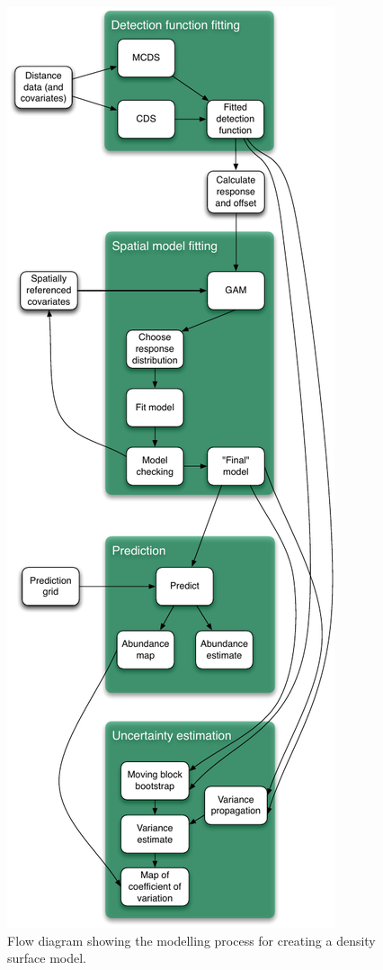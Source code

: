 \documentclass[a4paper,12pt]{article}
\begin{document}
\begin{figure}[h!]
  \caption{Flow diagram showing the modelling process for creating a density surface model.}
  \label{flow}
  \begin{center}
    \includegraphics[height=\textheight]{flowdiagram-reduced}
  \end{center}
\end{figure}
\end{document}
